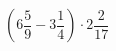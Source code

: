 \begin{ex}[type=calculate]
	\begin{condition}
		\( \left( 6\dfrac{5}{9}-3\dfrac{1}{4} \right)\cdot2\dfrac{2}{17} \)
	\end{condition}
	\answer{}
\end{ex}